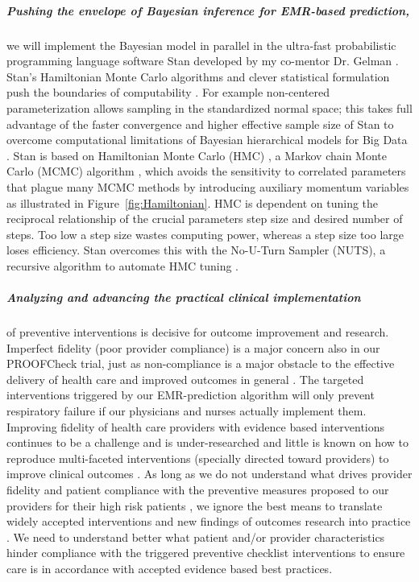 \documentclass[11pt,notitlepage]{article}
\begin{document}
\subparagraph{Pushing the envelope of Bayesian inference for EMR-based prediction,}
we will implement the Bayesian model in parallel in the ultra-fast probabilistic programming language software Stan developed by my co-mentor Dr. Gelman \cite{Stan_Software_2014}. Stan's Hamiltonian Monte Carlo algorithms \cite{Stan_Software_2014} and clever statistical formulation push the boundaries of computability \cite{Gelman-Hill_2014}. For example non-centered parameterization allows sampling in the standardized normal space; this takes full advantage of the faster convergence and higher effective sample size of Stan to overcome computational limitations of Bayesian hierarchical models for Big Data \cite{Gelman-Hill_2014}. Stan  is based on Hamiltonian Monte Carlo (HMC) \cite{Gelman-Hill_2014}, a Markov chain Monte Carlo (MCMC) algorithm \cite{StanislawUlam_1949}, which avoids the sensitivity to correlated parameters that plague many MCMC methods by introducing auxiliary momentum variables \cite{Homan_Gelman_NUTS_2014} as illustrated in Figure~\ref{fig:Hamiltonian}. HMC is dependent on tuning the reciprocal relationship of the crucial parameters step size and desired number of steps. Too low a step size wastes computing power, whereas a step size too large loses efficiency. Stan overcomes this with the No-U-Turn Sampler (NUTS), a recursive algorithm to automate HMC tuning \cite{Homan_Gelman_NUTS_2014}.

\subparagraph*{Analyzing and advancing the practical clinical implementation} of preventive interventions is decisive for outcome improvement and research. Imperfect fidelity (poor provider compliance) is a major concern also in our PROOFCheck trial, just as non-compliance is a major obstacle to the effective delivery of health care and improved outcomes in general
\cite{Duncan_16710766}. The targeted interventions triggered by our EMR-prediction algorithm will only prevent respiratory failure if our physicians and nurses actually implement them. Improving fidelity of health care providers with evidence based interventions continues to be a challenge and is under-researched \cite{Davis_7650822} and little is known on how to reproduce multi-faceted interventions (specially directed toward providers) to improve clinical outcomes \cite{Campbell_10987780}. As long as we do not understand what drives provider fidelity and patient compliance with the preventive measures proposed to our providers for their high risk patients  \cite{Mittman_15172904}, we ignore the best means to translate widely accepted interventions and new findings of outcomes research into practice \cite{Glasgow_17150029}. We need to understand better what patient and/or provider characteristics hinder compliance with the triggered preventive checklist interventions to ensure care is in accordance with accepted evidence based best practices.
\end{document}
